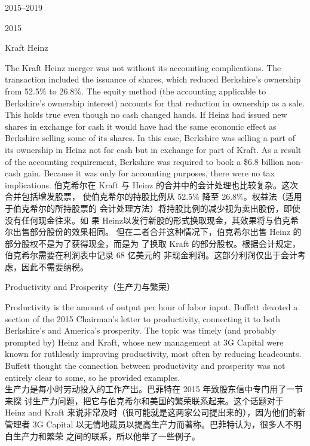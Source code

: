 \begin{chapter}{2015--2019}
\begin{section}{2015}
\begin{subsection}{Kraft Heinz}
\begin{verseparallel}
{    The Kraft Heinz merger was not without its accounting complications. The
    transaction included the issuance of shares, which reduced Berkshire's
    ownership from 52.5\% to 26.8\%. The equity method (the accounting
    applicable to Berkshire's ownership interest) accounts for that reduction
    in ownership as a sale. This holds true even though no cash changed hands.
    If Heinz had issued new shares in exchange for cash it would have had the
    same economic effect as Berkshire selling some of its shares. In this case,
    Berkshire was selling a part of its ownership in Heinz not for cash but in
    exchange for part of Kraft. As a result of the accounting requirement,
    Berkshire was required to book a \$6.8 billion non-cash gain. Because it was
    only for accounting purposes, there were no tax implications.
  }
  {
    伯克希尔在 Kraft 与 Heinz 的合并中的会计处理也比较复杂。这次合并包括增发股票，
    使伯克希尔的持股比例从 52.5\% 降至 26.8\%。权益法（适用于伯克希尔的所持股票的
    会计处理方法）将持股比例的减少视为卖出股份，即使没有任何现金往来。如
    果 Heinz以发行新股的形式换取现金，其效果将与伯克希尔出售部分股份的效果相同。
    但在二者合并这种情况下，伯克希尔出售 Heinz 的部分股权不是为了获得现金，而是为
    了换取 Kraft 的部分股权。根据会计规定，伯克希尔需要在利润表中记录 68 亿美元的
    非现金利润。这部分利润仅出于会计考虑，因此不需要纳税。
  } 

\end{verseparallel}

\end{subsection}

\begin{subsection}{Productivity and Prosperity（生产力与繁荣）}
\begin{verseparallel}
  {
    Productivity is the amount of output per hour of labor input. Buffett
    devoted a section of the 2015 Chairman's letter to productivity, connecting
    it to both Berkshire's and America's prosperity. The topic was timely (and
    probably prompted by) Heinz and Kraft, whose new management at 3G Capital
    were known for ruthlessly improving productivity, most often by reducing
    headcounts. Buffett thought the connection between productivity and
    prosperity was not entirely clear to some, so he provided examples. \\
  }
  {
    生产力是每小时劳动投入的工作产出。巴菲特在 2015 年致股东信中专门用了一节来探
    讨生产力问题，把它与伯克希尔和美国的繁荣联系起来。这个话题对于 Heinz and
    Kraft 来说非常及时（很可能就是这两家公司提出来的），因为他们的新管理者 3G
    Capital 以无情地裁员以提高生产力而著称。巴菲特认为，很多人不明白生产力和繁荣
    之间的联系，所以他举了一些例子。
  }
\end{verseparallel}


\end{subsection}
\end{section}
\end{chapter}
